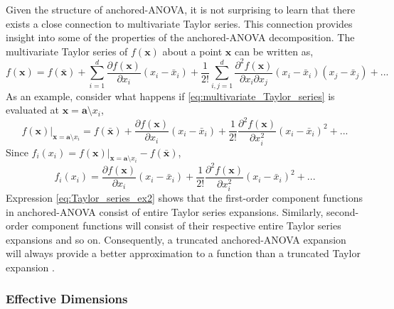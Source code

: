 Given the structure of anchored-\ac{ANOVA}, it is not surprising to learn that there exists a close connection to multivariate Taylor series\cite{HDMR}. This connection provides insight into some of the properties of the anchored-\ac{ANOVA} decomposition. The multivariate Taylor series of $f(\textbf{x})$ about a point $\textbf{\=x}$ can be written as,
\begin{equation} \label{eq:multivariate_Taylor_series}
    f\left(\textbf{x}\right) = 
     f\left(\bar{\textbf{x}}\right) +
      \sum_{i=1}^{d} 
       \frac{\partial f(\textbf{x})}{\partial x_i}\left(x_i - \bar{x}_i\right)
        + \frac{1}{2!}\sum_{i,j=1}^{d}
         \frac{\partial^2 f(\textbf{x})}{\partial x_i\partial x_j}
          \left(x_i - \bar{x}_i\right) \left(x_j - \bar{x}_j\right) + ...
\end{equation}       
As an example, consider what happens if \ref{eq:multivariate_Taylor_series} is evaluated at $\textbf{x} = \textbf{a}\setminus x_i$,
\begin{equation} \label{eq:Taylor_series_ex1}
    f\left(\textbf{x}\right)\vert_{\textbf{x} = \textbf{a}\setminus x_i} = 
     f\left(\bar{\textbf{x}}\right) +
      \frac{\partial f(\textbf{x})}{\partial x_i}\left(x_i - \bar{x}_i\right)
       + \frac{1}{2!} \frac{\partial^2 f(\textbf{x})}{\partial x_i^2}
        \left(x_i - \bar{x}_i\right)^2 + ...
\end{equation}
Since $f_i\left(x_i\right) = f\left(\textbf{x}\right)\vert_{\textbf{x} = \textbf{a}\setminus x_i} - f\left(\bar{\textbf{x}}\right)$, 
\begin{equation} \label{eq:Taylor_series_ex2}
    f_i\left(x_i\right) =
     \frac{\partial f(\textbf{x})}{\partial x_i}\left(x_i - \bar{x}_i\right)
       + \frac{1}{2!} \frac{\partial^2 f(\textbf{x})}{\partial x_i^2}
        \left(x_i - \bar{x}_i\right)^2 + ...      
\end{equation}  
Expression \ref{eq:Taylor_series_ex2} shows that the first-order component functions in anchored-\ac{ANOVA} consist of entire Taylor series expansions. Similarly, second-order component functions will consist of their respective entire Taylor series expansions and so on. Consequently, a truncated anchored-\ac{ANOVA} expansion will always provide a better approximation to a function than a truncated Taylor expansion \cite{HDMR}. 

\subsubsection{Effective Dimensions} \label{subsec:effective_dims}

